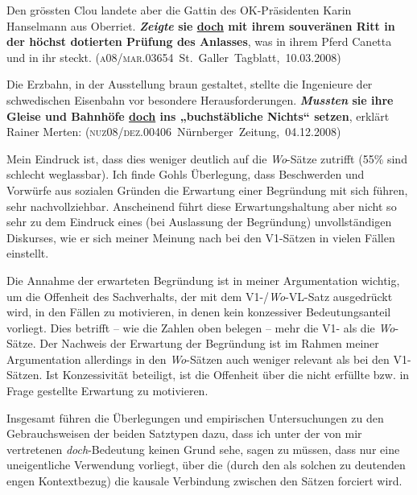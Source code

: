 \begin{exe}
	\ex\label{1052} 

	Den grössten Clou landete aber die Gattin des OK-Präsidenten Karin Hanselmann aus Oberriet. \textbf{\textit{Zeigte} sie \ul{doch} mit ihrem 			souveränen Ritt in der höchst dotierten Prüfung des Anlasses}, was in ihrem Pferd Canetta und in ihr steckt.                      
	\hfill\hbox{(\textsc{a08/mar.03654} St. Galler Tagblatt, 10.03.2008)}
\end{exe}\pagebreak                                 

\begin{exe}
	\ex\label{1053} 

	Die Erzbahn, in der Ausstellung braun gestaltet, stellte die Ingenieure der schwedischen Eisenbahn vor besondere Herausforderungen. 						\textbf{\textit{Mussten} sie ihre Gleise und Bahnhöfe \ul{doch} ins „buchstäbliche Nichts“ setzen}, erklärt Rainer Merten:                     
	\hfill\hbox{(\textsc{nuz08/dez.00406} Nürnberger Zeitung, 04.12.2008)}
\end{exe}
Mein Eindruck ist, dass dies weniger deutlich auf die \textit{Wo}-Sätze zutrifft (55\% sind schlecht weglassbar). Ich finde Gohls Überlegung, dass Beschwerden und Vorwürfe aus sozialen Gründen die Erwartung einer Begründung mit sich führen, sehr nachvollziehbar. Anscheinend führt diese Erwartungshaltung aber nicht so sehr zu dem Eindruck eines (bei Auslassung der Begründung) unvollständigen Diskurses, wie er sich meiner Meinung nach bei den V1-Sätzen in vielen Fällen einstellt.

Die Annahme der erwarteten Begründung ist in meiner Argumentation wichtig, um die Offenheit des Sachverhalts, der mit dem V1-/\textit{Wo}-VL-Satz ausgedrückt wird, in den Fällen zu motivieren, in denen kein konzessiver Bedeutungsanteil vorliegt. Dies betrifft – wie die Zahlen oben belegen – mehr die V1- als die \textit{Wo}-Sätze. Der Nachweis der Erwartung der Begründung ist im Rahmen meiner Argumentation allerdings in den \textit{Wo}-Sätzen auch weniger relevant als bei den V1-Sätzen. Ist Konzessivität beteiligt, ist die Offenheit über die nicht erfüllte bzw. in Frage gestellte Erwartung zu motivieren. 

Insgesamt führen die Überlegungen und empirischen Untersuchungen zu den Gebrauchsweisen der beiden Satztypen dazu, dass ich unter der von mir vertretenen \textit{doch}-Bedeutung keinen Grund sehe, sagen zu müssen, dass nur eine uneigentliche Verwendung vorliegt, über die (durch den als solchen zu deutenden engen Kontextbezug) die kausale Verbindung zwischen den Sätzen forciert wird.

